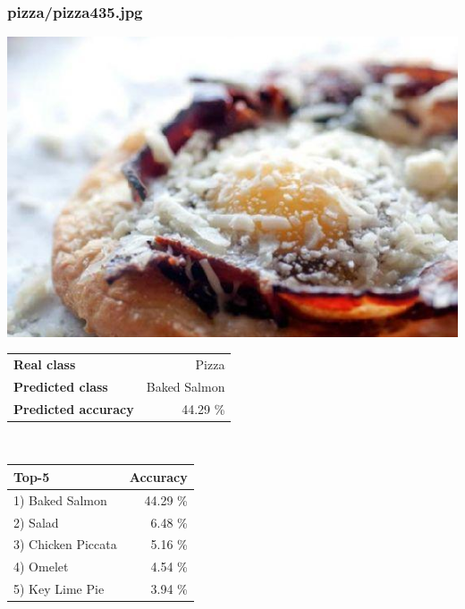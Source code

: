 \subsubsection{pizza/pizza435.jpg}

\begin{minipage}[t]{0.4\textwidth}
	\vspace{0pt}
	\includegraphics[width=\linewidth]{images/evaluation-images/pizza/pizza435.jpg}
\end{minipage}
\hfill
\begin{minipage}[t]{0.5\textwidth}
	\vspace{0pt}\raggedright
	\begin{tabularx}{\textwidth}{X r}
		\small \textbf{Real class} & \small Pizza\\
		\small \textbf{Predicted class} & \small Baked Salmon\\
		\small \textbf{Predicted accuracy} & \small 44.29 \%
    \end{tabularx}\\
    
    \vspace{6pt}
	\begin{tabularx}{\textwidth}{X r}
        \small \textbf{Top-5} & \small \textbf{Accuracy} \\
        \hline
		\small 1) Baked Salmon & \small 44.29 \%\\\small 2) Salad & \small 6.48 \%\\\small 3) Chicken Piccata & \small 5.16 \%\\\small 4) Omelet & \small 4.54 \%\\\small 5) Key Lime Pie & \small 3.94 \%
    \end{tabularx}
\end{minipage}
    
